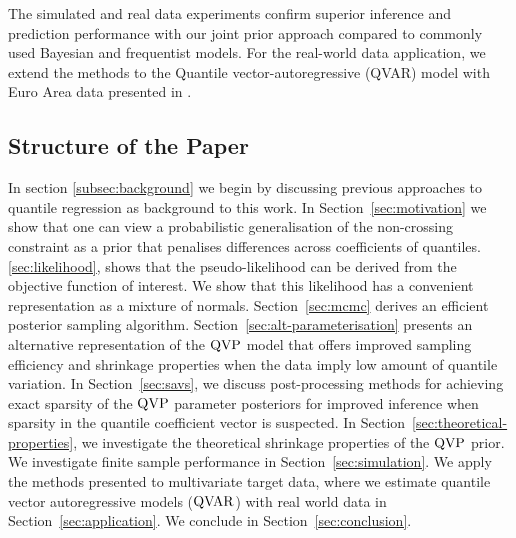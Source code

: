 %
The simulated and real data experiments confirm superior inference and prediction performance with our joint prior approach compared to commonly used Bayesian and frequentist models. For the real-world data application, we extend the methods to the Quantile vector-autoregressive (QVAR) model with Euro Area data presented in \citet{chavleishvili2024forecasting}. 
%
%
\subsection{Structure of the Paper}
%
In section \ref{subsec:background} we begin by discussing previous approaches to quantile regression as background to this work.
In Section~\ref{sec:motivation} we show that one can view a probabilistic generalisation of the non-crossing constraint as a prior that penalises differences across coefficients of quantiles. \ref{sec:likelihood}, shows that the pseudo-likelihood can be  derived from the objective function of interest. 
We show that this likelihood has a convenient representation as a mixture of normals.
Section~\ref{sec:mcmc} derives an efficient posterior sampling algorithm.
Section~\ref{sec:alt-parameterisation} presents an alternative representation of the $\operatorname{QVP}$ model that offers improved sampling efficiency and shrinkage properties when the data imply low amount of quantile variation.
In Section~\ref{sec:savs}, we discuss post-processing methods for achieving exact sparsity of the $\operatorname{QVP}$ parameter posteriors for improved inference when sparsity in the quantile coefficient vector is suspected.
In Section~\ref{sec:theoretical-properties}, we investigate the theoretical shrinkage properties of the $\operatorname{QVP}$ prior.
We investigate finite sample performance in Section~\ref{sec:simulation}.
We apply the methods presented to multivariate target data, where we   estimate quantile vector autoregressive models ($\operatorname{QVAR}$) with real world data in Section~\ref{sec:application}.
We conclude in Section~\ref{sec:conclusion}.
%
